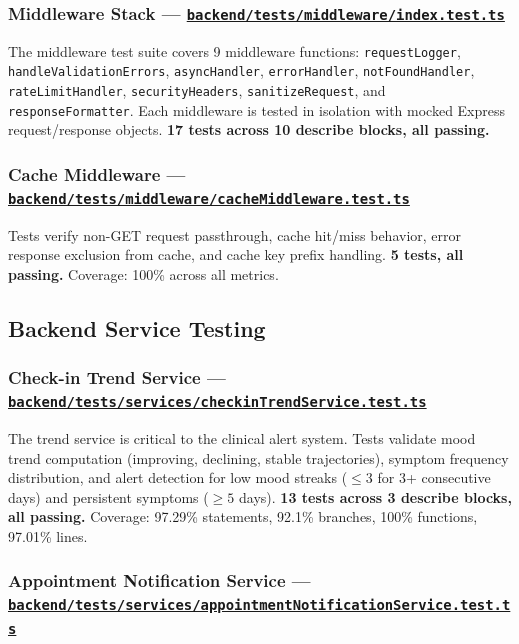 \documentclass[12pt,letterpaper]{article}
\newcommand{\ghrepo}{https://github.com/omniV1/lunaraCare}
\begin{document}
\subsubsection{Middleware Stack --- \href{\ghrepo/blob/main/backend/tests/middleware/index.test.ts}{\texttt{backend/tests/middleware/index.test.ts}}}

The middleware test suite covers 9 middleware functions: \texttt{requestLogger}, \texttt{handleValidationErrors}, \texttt{asyncHandler}, \texttt{errorHandler}, \texttt{notFoundHandler}, \texttt{rateLimitHandler}, \texttt{securityHeaders}, \texttt{sanitizeRequest}, and \texttt{responseFormatter}. Each middleware is tested in isolation with mocked Express request/response objects. \textbf{17 tests across 10 describe blocks, all passing.}

\subsubsection{Cache Middleware --- \href{\ghrepo/blob/main/backend/tests/middleware/cacheMiddleware.test.ts}{\texttt{backend/tests/middleware/cacheMiddleware.test.ts}}}

Tests verify non-GET request passthrough, cache hit/miss behavior, error response exclusion from cache, and cache key prefix handling. \textbf{5 tests, all passing.} Coverage: 100\% across all metrics.

\subsection{Backend Service Testing}

\subsubsection{Check-in Trend Service --- \href{\ghrepo/blob/main/backend/tests/services/checkinTrendService.test.ts}{\texttt{backend/tests/services/checkinTrendService.test.ts}}}

The trend service is critical to the clinical alert system. Tests validate mood trend computation (improving, declining, stable trajectories), symptom frequency distribution, and alert detection for low mood streaks ($\leq 3$ for 3+ consecutive days) and persistent symptoms ($\geq 5$ days). \textbf{13 tests across 3 describe blocks, all passing.} Coverage: 97.29\% statements, 92.1\% branches, 100\% functions, 97.01\% lines.

\subsubsection{Appointment Notification Service --- \href{\ghrepo/blob/main/backend/tests/services/appointmentNotificationService.test.ts}{\texttt{backend/tests/services/appointmentNotificationService.test.ts}}}
\end{document}
